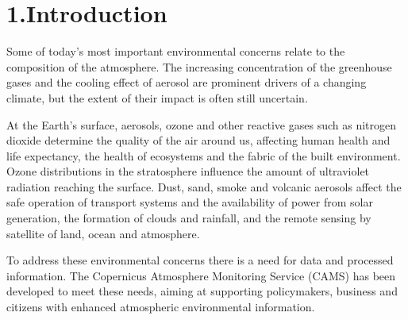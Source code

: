 \documentclass[9pt]{report}
\begin{document}
\begin{mdtoc}
\begin{mdtocblock}
\begin{mdtocblock}
\begin{mdtocblock}

\end{mdtocblock}%
\end{mdtocblock}%



\end{mdtocblock}%
\end{mdtoc}%
\section{1.\hspace*{0.5em}Introduction}\label{sec-introduction}%

\noindent{}Some of today’s most important environmental concerns relate to the 
composition of the atmosphere. The increasing concentration of the 
greenhouse gases and the cooling effect of aerosol are prominent 
drivers of a changing climate, but the extent of their impact is 
often still uncertain.%

At the Earth’s surface, aerosols, ozone and other reactive gases such as 
nitrogen dioxide determine the quality of the air around us, affecting 
human health and life expectancy, the health of ecosystems and the 
fabric of the built environment. Ozone distributions in the stratosphere 
influence the amount of ultraviolet radiation reaching the surface. 
Dust, sand, smoke and volcanic aerosols affect the safe operation of 
transport systems and the availability of power from solar generation, 
the formation of clouds and rainfall, and the remote sensing by satellite 
of land, ocean and atmosphere.%

To address these environmental concerns there is a need for data and 
processed information. The Copernicus Atmosphere Monitoring Service (CAMS) 
has been developed to meet these needs, aiming at supporting policymakers, 
business and citizens with enhanced atmospheric environmental information.%
\end{document}
